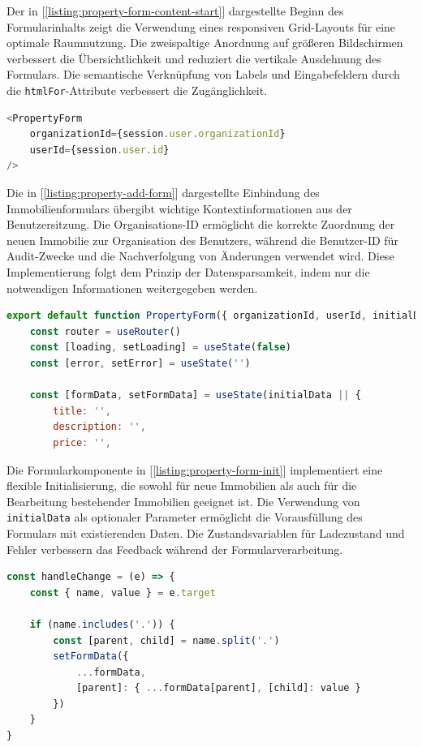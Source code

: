 			
			Der in [\ref{listing:property-form-content-start}] dargestellte Beginn des Formularinhalts zeigt die Verwendung eines responsiven Grid-Layouts für eine optimale Raumnutzung. Die zweispaltige Anordnung auf größeren Bildschirmen verbessert die Übersichtlichkeit und reduziert die vertikale Ausdehnung des Formulars. Die semantische Verknüpfung von Labels und Eingabefeldern durch die \texttt{htmlFor}-Attribute verbessert die Zugänglichkeit.
			
			
\begin{lstlisting}[language=JavaScript, caption={Einbindung des Immobilienformulars.}, label={listing:property-add-form}]
<PropertyForm 
	organizationId={session.user.organizationId}
	userId={session.user.id}
/>
\end{lstlisting}

		
		Die in [\ref{listing:property-add-form}] dargestellte Einbindung des Immobilienformulars übergibt wichtige Kontextinformationen aus der Benutzersitzung. Die Organisations-ID ermöglicht die korrekte Zuordnung der neuen Immobilie zur Organisation des Benutzers, während die Benutzer-ID für Audit-Zwecke und die Nachverfolgung von Änderungen verwendet wird. Diese Implementierung folgt dem Prinzip der Datensparsamkeit, indem nur die notwendigen Informationen weitergegeben werden.
		
		
\begin{lstlisting}[language=JavaScript, caption={Initialisierung der Formularkomponente.}, label={listing:property-form-init}]
export default function PropertyForm({ organizationId, userId, initialData }) {
	const router = useRouter()
	const [loading, setLoading] = useState(false)
	const [error, setError] = useState('')
					
	const [formData, setFormData] = useState(initialData || {
		title: '',
		description: '',
		price: '',
\end{lstlisting}

				
				Die Formularkomponente in [\ref{listing:property-form-init}] implementiert eine flexible Initialisierung, die sowohl für neue Immobilien als auch für die Bearbeitung bestehender Immobilien geeignet ist. Die Verwendung von \texttt{initialData} als optionaler Parameter ermöglicht die Vorausfüllung des Formulars mit existierenden Daten. Die Zustandsvariablen für Ladezustand und Fehler verbessern das Feedback während der Formularverarbeitung.
				
                
\begin{lstlisting}[language=JavaScript, caption={Behandlung von Formularänderungen.}, label={listing:property-form-change}]
const handleChange = (e) => {
	const { name, value } = e.target
				
	if (name.includes('.')) {
		const [parent, child] = name.split('.')
		setFormData({
			...formData,
			[parent]: { ...formData[parent], [child]: value }
		})
	}
}
\end{lstlisting}

